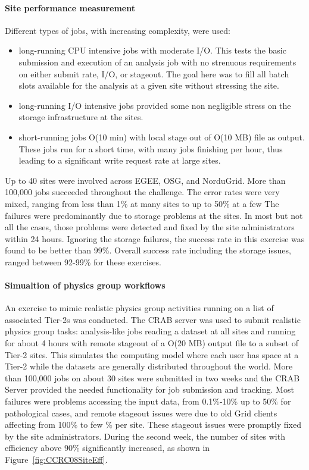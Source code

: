 \paragraph{Site performance measurement}
Different types of jobs, with increasing complexity, were used:
\begin{itemize}
\item long-running CPU intensive jobs with moderate I/O. This tests the basic submission and execution of an analysis job with no strenuous requirements on 
either submit rate, I/O, or stageout. The goal here was to fill all batch slots available for the analysis at a given site without stressing the site.
\item long-running I/O intensive jobs provided some non negligible stress on 
the storage infrastructure at the sites.
\item short-running jobs O(10 min) with local stage out of O(10 MB) file as output. These jobs run for a short time, with many jobs finishing per hour, thus leading to a significant write request rate at large sites.
\end{itemize}
Up to 40 sites were involved across EGEE, OSG, and NorduGrid. More than 100,000 jobs succeeded throughout the challenge. The error rates were very mixed, ranging from less than 1\% at many sites to up to 50\% at a few %
The failures were predominantly due to storage problems at the sites. 
In most but not all the cases, those problems were detected and fixed by the site administrators within 24 hours. Ignoring the storage failures, the success rate in this exercise was found to be better than 99\%. Overall success rate including the storage issues, ranged between 92-99\% for these exercises.

\paragraph{Simualtion of physics group workflows}
An exercise to mimic realistic physics group activities running
on a list of associated Tier-2s was conducted. 
The CRAB server was used to submit realistic physics group tasks: 
analysis-like jobs reading a dataset at all sites and running for 
about 4 hours with remote stageout of a O(20 MB) output file to a subset of 
Tier-2 sites. This simulates the computing model where each user has space at 
a Tier-2 while the datasets are generally distributed throughout the world.
More than 100,000 jobs on about 30 sites were submitted in two weeks and 
the CRAB Server provided the needed functionality for job submission and 
tracking. %
Most failures were problems accessing the input data, from 0.1\%-10\% up to 50\% for pathological cases, and remote stageout issues were due to old Grid clients affecting from 100\% to few \% per site. These stageout issues were
promptly fixed by the site administrators. 
During the second week, the number of sites with efficiency above 90\% significantly increased, as shown in Figure~\ref{fig:CCRC08SiteEff}.
